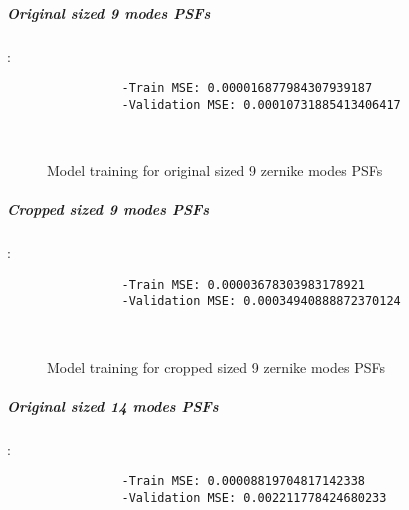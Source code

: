 		\subparagraph{Original sized 9 modes PSFs}:\\
		\begin{lstlisting}	
        		-Train MSE: 0.000016877984307939187
        		-Validation MSE: 0.00010731885413406417
		\end{lstlisting}
		
		\begin{figure*}[ht!]
			\hspace{\fill}
			\hspace{\fill}
			\\
			\caption{Model training for original sized 9 zernike modes PSFs}
		\end{figure*}
		\FloatBarrier
		
		\subparagraph{Cropped sized 9 modes PSFs}:\\
		\begin{lstlisting}	
        		-Train MSE: 0.00003678303983178921
        		-Validation MSE: 0.00034940888872370124
		\end{lstlisting}
		
		\begin{figure*}[ht!]
			\hspace{\fill}
			\hspace{\fill}
			\\
			\caption{Model training for cropped sized 9 zernike modes PSFs}
		\end{figure*}
		\FloatBarrier
		
		\subparagraph{Original sized 14 modes PSFs}:\\
		\begin{lstlisting}	
        		-Train MSE: 0.00008819704817142338
        		-Validation MSE: 0.002211778424680233
		\end{lstlisting}
		
